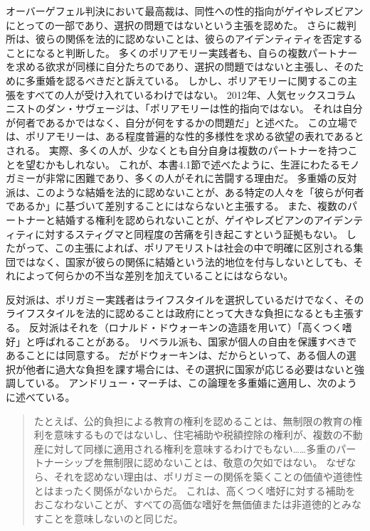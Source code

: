 \documentclass[paper=a4,book,openany]{jlreq}
\newcommand{\ig}[1]{}           %
\begin{document}
オーバーゲフェル判決において最高裁は、同性への性的指向がゲイやレズビアンにとっての一部であり、選択の問題ではないという主張を認めた。
さらに裁判所は、彼らの関係を法的に認めないことは、彼らのアイデンティティを否定することになると判断した。
多くのポリアモリー実践者も、自らの複数パートナーを求める欲求が同様に自分たちのであり、選択の問題ではないと主張し、そのために多重婚を認るべきだと訴えている。
しかし、ポリアモリーに関するこの主張をすべての人が受け入れているわけではない。
2012年、人気セックスコラムニストのダン・サヴェージは、「ポリアモリーは性的指向ではない。
それは自分が何者であるかではなく、自分が何をするかの問題だ」と述べた\citep{savage12:_savag_busted}。
この立場では、ポリアモリーは、ある程度普遍的な性的多様性を求める欲望の表れであるとされる。
実際、多くの人が、少なくとも自分自身は複数のパートナーを持つことを望むかもしれない。
これが、本書4.1節で述べたように、生涯にわたるモノガミーが非常に困難であり、多くの人がそれに苦闘する理由だ。
多重婚の反対派は、このような結婚を法的に認めないことが、ある特定の人々を「彼らが何者であるか」に基づいて差別することにはならないと主張する。
また、複数のパートナーと結婚する権利を認められないことが、ゲイやレズビアンのアイデンティティに対するスティグマと同程度の苦痛を引き起こすという証拠もない。
したがって、この主張によれば、ポリアモリストは社会の中で明確に区別される集団ではなく、国家が彼らの関係に結婚という法的地位を付与しないとしても、それによって何らかの不当な差別を加えていることにはならない。

反対派は、ポリガミー実践者はライフスタイルを選択しているだけでなく、そのライフスタイルを法的に認めることは政府にとって大きな負担になるとも主張する。
反対派はそれを（ロナルド・ドウォーキン\ig{Ronald Dworkin}の造語を用いて）「高くつく嗜好」と呼ばれることがある。
リベラル派も、国家が個人の自由を保護すべきであることには同意する。
だがドウォーキンは、だからといって、ある個人の選択が他者に過大な負担を課す場合には、その選択に国家が応じる必要はないと強調している\citep[p.229]{dworkin81:_what_is_equal}。
アンドリュー・マーチは、この論理を多重婚に適用し、次のように述べている。

\begin{quote}
たとえば、公的負担による教育の権利を認めることは、無制限の教育の権利を意味するものではないし、住宅補助や税額控除の権利が、複数の不動産に対して同様に適用される権利を意味するわけでもない……多重のパートナーシップを無制限に認めないことは、敬意の欠如ではない。
なぜなら、それを認めない理由は、ポリガミーの関係を築くことの価値や道徳性とはまったく関係がないからだ。
これは、高くつく嗜好に対する補助をおこなわないことが、すべての高価な嗜好を無価値または非道徳的とみなすことを意味しないのと同じだ。
\citep[p.249]{march11:_is_there_right_polyg}
\end{quote}
\end{document}
